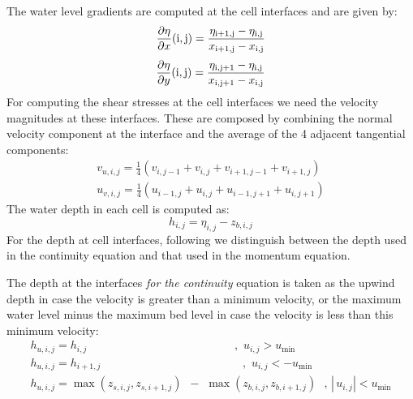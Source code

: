 The water level gradients are computed at the cell interfaces and are given by:
\begin{equation} \label{7)} 
\frac{\partial \eta }{\partial x} {\rm (i,j)}=\frac{\eta _{{\rm i+1,j}} -\eta _{{\rm i,j}} }{x_{{\rm i+1,j}} -x_{{\rm i,j}} }  
\end{equation} 
\begin{equation} \label{8)} 
\frac{\partial \eta }{\partial y} {\rm (i,j)}=\frac{\eta _{{\rm i,j+1}} -\eta _{{\rm i,j}} }{x_{{\rm i,j+1}} -x_{{\rm i,j}} }  
\end{equation} 
For computing the shear stresses at the cell interfaces we need the velocity magnitudes at these interfaces. These are composed by combining the normal velocity component at the interface and the average of the 4 adjacent tangential components:
\begin{equation} \label{9)} 
\begin{array}{l} {v_{u,i,j} =\frac{1}{4} (v_{i,j-1} +v_{i,j} +v_{i+1,j-1} +v_{i+1,j} )} \\ {u_{v,i,j} =\frac{1}{4} (u_{i-1,j} +u_{i,j} +u_{i-1,j+1} +u_{i,j+1} )} \end{array} 
\end{equation} 
The water depth in each cell is computed as:
\begin{equation} \label{10)} 
h_{i,j} =\eta _{i,j} -z_{b,i,j}  
\end{equation} 
For the depth at cell interfaces, following \citet{Stelling2003} we distinguish between the depth used in the continuity equation and that used in the momentum equation. 

The depth at the interfaces \textit{for the continuity} equation is taken as the upwind depth in case the velocity is greater than a minimum velocity, or the maximum water level minus the maximum bed level in case the velocity is less than this minimum velocity:
\begin{equation} \label{11)} 
\begin{array}{l} {h_{u,i,j} =h_{i,j} \, \, \, \, \, \, \, \, \, \, \, \, \, \, \, \, \, \, \, \, \, \, \, \, \, \, \, \, \, \, \, \, \, \, \, \, \, \, \, \, \, \, \, \, \, \, \, \, \, \, \, \, \, \, \, \, \, \, \, \, \, \, \, \, \, \, \, \, \, \, \, \, \, \, \, \, \, \, ,\, \, u_{i,j} >u_{\min } } \\ {h_{u,i,j} =h_{i+1,j} \, \, \, \, \, \, \, \, \, \, \, \, \, \, \, \, \, \, \, \, \, \, \, \, \, \, \, \, \, \, \, \, \, \, \, \, \, \, \, \, \, \, \, \, \, \, \, \, \, \, \, \, \, \, \, \, \, \, \, \, \, \, \, \, \, \, \, \, \, \, \, \, \, \, \, ,\, \, u_{i,j} <-u_{\min } } \\ {h_{u,i,j} =\max (z_{s,i,j} ,z_{s,i+1,j} )\, \, \, -\, \, \max (z_{b,i,j} ,z_{b,i+1,j} )\, \, \, \, ,\, \left|\, u_{i,j} \right|<u_{\min } } \end{array} 
\end{equation} 

